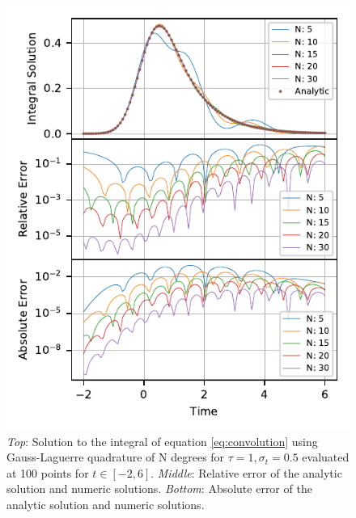 \begin{figure}
    \centering
    \includegraphics{CodeAndFigures/GaussLaguerreQuadrature.pdf}
    \caption{\emph{Top}: Solution to the integral of equation \ref{eq:convolution} using Gauss-Laguerre quadrature of N degrees for $\tau=1,\sigma_t=0.5$ evaluated at 100 points for $t\in[-2,6]$. \emph{Middle}: Relative error of the analytic solution and numeric solutions. \emph{Bottom}: Absolute error of the analytic solution and numeric solutions.}
    \label{fig:GaussLaguerrePlot}
\end{figure}

